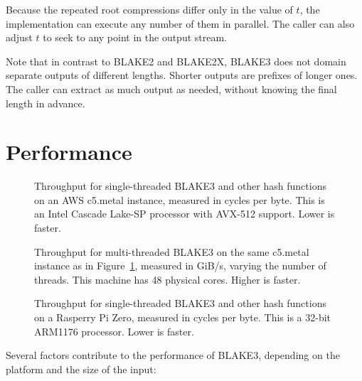 \documentclass[11pt,notitlepage,a4paper]{article}
\begin{document}
Because the repeated root compressions differ only in the value of $t$, the
implementation can execute any number of them in parallel. The caller can also
adjust $t$ to seek to any point in the output stream.

Note that in contrast to BLAKE2 and BLAKE2X, BLAKE3 does not domain separate
outputs of different lengths. Shorter outputs are prefixes of longer ones. The
caller can extract as much output as needed, without knowing the final length
in advance.

\section{Performance}\label{sec:performance}

\begin{figure}[h]
\centering

\caption{Throughput for single-threaded BLAKE3 and other hash functions on an
    AWS c5.metal instance, measured in cycles per byte. This is an Intel
    Cascade Lake-SP processor with AVX-512 support. Lower is faster.}%
\label{fig:avx512}
\end{figure}

\begin{figure}[h]
\centering

    \caption{Throughput for multi-threaded BLAKE3 on the same c5.metal instance
    as in Figure~\ref{fig:avx512}, measured in GiB/s, varying the number of
    threads. This machine has 48 physical cores. Higher is faster.}%
\label{fig:threads}
\end{figure}

\begin{figure}[h]
\centering
%

\caption{Throughput for single-threaded BLAKE3 and other hash functions on a
    Rasperry Pi Zero, measured in cycles per byte. This is a 32-bit ARM1176
    processor. Lower is faster.}%
\label{fig:rpizero}
\end{figure}

Several factors contribute to the performance of BLAKE3, depending on the
platform and the size of the input:
\end{document}
